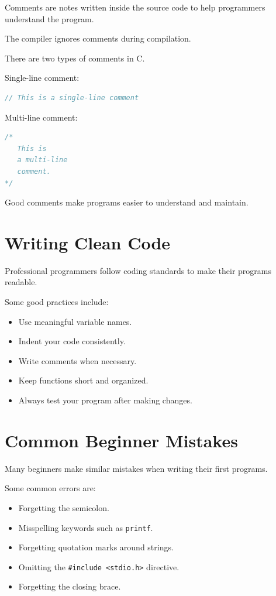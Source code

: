 \documentclass[12pt,openany]{book}
\begin{document}
Comments are notes written inside the source code to help programmers understand the program.

The compiler ignores comments during compilation.

There are two types of comments in C.

Single-line comment:

\begin{lstlisting}[language=C]
// This is a single-line comment
\end{lstlisting}

Multi-line comment:

\begin{lstlisting}[language=C]
/*
   This is
   a multi-line
   comment.
*/
\end{lstlisting}

Good comments make programs easier to understand and maintain.

\section{Writing Clean Code}

Professional programmers follow coding standards to make their programs readable.

Some good practices include:

\begin{itemize}
    \item Use meaningful variable names.
    \item Indent your code consistently.
    \item Write comments when necessary.
    \item Keep functions short and organized.
    \item Always test your program after making changes.
\end{itemize}

\section{Common Beginner Mistakes}

Many beginners make similar mistakes when writing their first programs.

Some common errors are:

\begin{itemize}
    \item Forgetting the semicolon.
    \item Misspelling keywords such as \texttt{printf}.
    \item Forgetting quotation marks around strings.
    \item Omitting the \texttt{\#include <stdio.h>} directive.
    \item Forgetting the closing brace.
\end{itemize}
\end{document}
